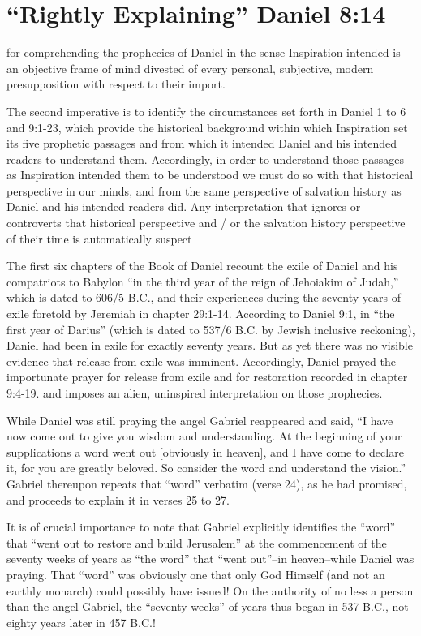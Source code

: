 \chapter{``Rightly Explaining'' Daniel 8:14}
\label{ch:explain}

 for comprehending the prophecies of Daniel in the sense
Inspiration intended is an objective frame of mind divested of every
personal, subjective, modern presupposition with respect to their import.

The second imperative is to identify the circumstances set forth in Daniel 1
to 6 and 9:1-23, which provide the historical background within which
Inspiration set its five prophetic passages and from which it intended
Daniel and his intended readers to understand them. Accordingly, in order to
understand those passages as Inspiration intended them to be understood we
must do so with that historical perspective in our minds, and from the same
perspective of salvation history as Daniel and his intended readers did. Any
interpretation that ignores or controverts that historical perspective and /
or the salvation history perspective of their time is automatically suspect

The first six chapters of the Book of Daniel recount the exile of Daniel and
his compatriots to Babylon ``in the third year of the reign of Jehoiakim of
Judah,'' which is dated to 606/5 B.C., and their experiences during the
seventy years of exile foretold by Jeremiah in chapter 29:1-14. According to
Daniel 9:1, in ``the first year of Darius'' (which is dated to 537/6 B.C. by
Jewish inclusive reckoning), Daniel had been in exile for exactly seventy
years. But as yet there was no visible evidence that release from exile was
imminent. Accordingly, Daniel prayed the importunate prayer for release from
exile and for restoration recorded in chapter 9:4-19. 
and imposes an alien, uninspired interpretation on those prophecies. 

While Daniel was still praying the angel Gabriel 
reappeared and said, ``I
have now come out to give you wisdom and understanding. At the beginning of
your supplications a word went out [obviously in heaven], and I have come to
declare it, for you are greatly beloved. So consider the word and understand
the vision.'' Gabriel thereupon repeats that ``word'' verbatim (verse 24), as
he had promised, and proceeds to explain it in verses 25 to 27. 

It is of crucial importance to note that Gabriel explicitly identifies the
``word'' that ``went out to restore and build Jerusalem'' at the commencement of
the seventy weeks of years as ``the word'' that ``went out''--in heaven--while
Daniel was praying. That 
``word'' was obviously one that only God Himself 
(and not an earthly monarch) could possibly have issued! On the authority of
no less a person than the angel Gabriel, the ``seventy weeks'' of years thus
began in 537 B.C., not eighty years later in 457 B.C.!

